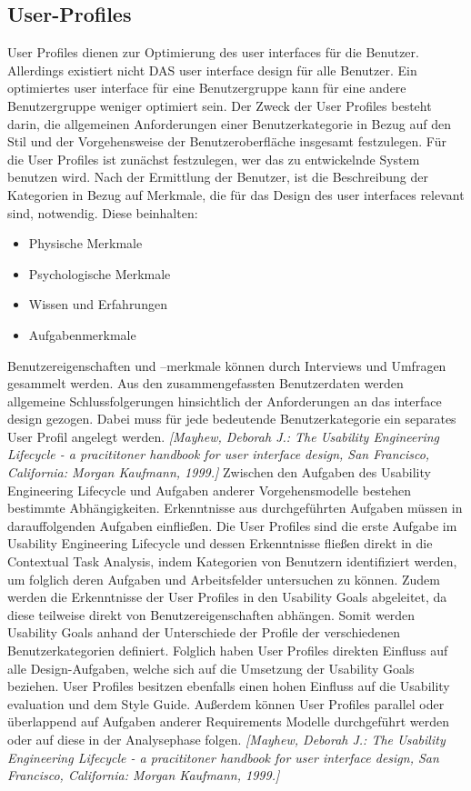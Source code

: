 \documentclass[a4paper,11pt]{article}%
\renewcommand{\\}{\vspace*{0.5\baselineskip} \newline}
\begin{document}
\subsection{User-Profiles}
	User Profiles dienen zur Optimierung des user interfaces für die Benutzer. Allerdings existiert nicht DAS user interface design für alle Benutzer. Ein optimiertes user interface für eine Benutzergruppe kann für eine andere Benutzergruppe weniger optimiert sein. Der Zweck der User Profiles besteht darin, die allgemeinen Anforderungen einer Benutzerkategorie in Bezug auf den Stil und der Vorgehensweise der Benutzeroberfläche insgesamt festzulegen.\newline
	Für die User Profiles ist zunächst festzulegen, wer das zu entwickelnde System benutzen wird. Nach der Ermittlung der Benutzer, ist die Beschreibung der Kategorien in Bezug auf Merkmale, die für das Design des user interfaces relevant sind, notwendig. Diese beinhalten:
	\begin{itemize}
		\item Physische Merkmale
		\item Psychologische Merkmale
		\item Wissen und Erfahrungen
		\item Aufgabenmerkmale
	\end{itemize}
	Benutzereigenschaften und –merkmale können durch Interviews und Umfragen gesammelt werden. Aus den zusammengefassten Benutzerdaten werden allgemeine Schlussfolgerungen hinsichtlich der Anforderungen an das interface design gezogen. Dabei muss für jede bedeutende Benutzerkategorie ein separates User Profil angelegt werden. \emph{[Mayhew, Deborah J.:	The Usability Engineering Lifecycle - a pracititoner handbook for user interface design, San Francisco, California: Morgan Kaufmann, 1999.]}\newline
	Zwischen den Aufgaben des Usability Engineering Lifecycle und Aufgaben anderer Vorgehensmodelle bestehen bestimmte Abhängigkeiten. Erkenntnisse aus durchgeführten Aufgaben müssen in darauffolgenden Aufgaben einfließen. Die User Profiles sind die erste Aufgabe im Usability Engineering Lifecycle und dessen Erkenntnisse fließen direkt in die Contextual Task Analysis, indem Kategorien von Benutzern identifiziert werden, um folglich deren Aufgaben und Arbeitsfelder untersuchen zu können. Zudem werden die Erkenntnisse der User Profiles in den Usability Goals abgeleitet, da diese teilweise direkt von Benutzereigenschaften abhängen. Somit werden Usability Goals anhand der Unterschiede der Profile der verschiedenen Benutzerkategorien definiert. Folglich haben User Profiles direkten Einfluss auf alle Design-Aufgaben, welche sich auf die Umsetzung der Usability Goals beziehen. User Profiles besitzen ebenfalls einen hohen Einfluss auf die Usability evaluation und dem Style Guide. Außerdem können User Profiles parallel oder überlappend auf Aufgaben anderer Requirements Modelle durchgeführt werden oder auf diese in der Analysephase folgen. \emph{[Mayhew, Deborah J.:	The Usability Engineering Lifecycle - a pracititoner handbook for user interface design, San Francisco, California: Morgan Kaufmann, 1999.]} \newline
\end{document}
